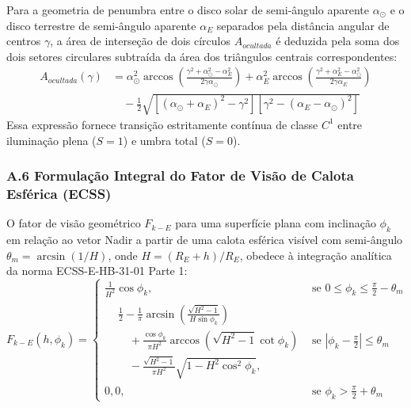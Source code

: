 Para a geometria de penumbra entre o disco solar de semi-ângulo aparente $\alpha_\odot$ e o disco terrestre de semi-ângulo aparente $\alpha_E$ separados pela distância angular de centros $\gamma$, a área de interseção de dois círculos $A_{ocultada}$ é deduzida pela soma dos dois setores circulares subtraída da área dos triângulos centrais correspondentes:
\begin{align}
    A_{ocultada}(\gamma) &= \alpha_\odot^2 \arccos\left( \frac{\gamma^2 + \alpha_\odot^2 - \alpha_E^2}{2 \gamma \alpha_\odot} \right) + \alpha_E^2 \arccos\left( \frac{\gamma^2 + \alpha_E^2 - \alpha_\odot^2}{2 \gamma \alpha_E} \right) \nonumber \\
    &\quad - \frac{1}{2} \sqrt{\left[ (\alpha_\odot + \alpha_E)^2 - \gamma^2 \right] \left[ \gamma^2 - (\alpha_E - \alpha_\odot)^2 \right]}
\end{align}
Essa expressão fornece transição estritamente contínua de classe $C^1$ entre iluminação plena ($S=1$) e umbra total ($S=0$).

\subsubsection*{A.6 Formulação Integral do Fator de Visão de Calota Esférica (ECSS)}

O fator de visão geométrico $F_{k-E}$ para uma superfície plana com inclinação $\phi_k$ em relação ao vetor Nadir a partir de uma calota esférica visível com semi-ângulo $\theta_m = \arcsin(1/H)$, onde $H = (R_E + h)/R_E$, obedece à integração analítica da norma ECSS-E-HB-31-01 Parte 1:
\begin{equation}
    F_{k-E}(h, \phi_k) = 
    \begin{cases}
        \frac{1}{H^2} \cos \phi_k, & \text{se } 0 \le \phi_k \le \frac{\pi}{2} - \theta_m \\[0.15cm]
        \begin{aligned}
            &\frac{1}{2} - \frac{1}{\pi} \arcsin\left( \frac{\sqrt{H^2 - 1}}{H \sin \phi_k} \right) \\
            &\quad + \frac{\cos \phi_k}{\pi H^2} \arccos\left( \sqrt{H^2 - 1} \cot \phi_k \right) \\
            &\quad - \frac{\sqrt{H^2 - 1}}{\pi H^2} \sqrt{1 - H^2 \cos^2 \phi_k},
        \end{aligned} & \text{se } \left|\phi_k - \frac{\pi}{2}\right| \le \theta_m \\[0.45cm]
        0{,}0, & \text{se } \phi_k > \frac{\pi}{2} + \theta_m
    \end{cases}
    \label{eq:fator_visao_ecss_apendice}
\end{equation}

